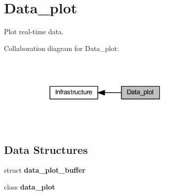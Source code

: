 \section{Data\+\_\+plot}
\label{group__data__plot}


Plot real-\/time data.  


Collaboration diagram for Data\+\_\+plot\+:
\nopagebreak
\begin{figure}[H]
\begin{center}
\leavevmode
\includegraphics[width=247pt]{group__data__plot}
\end{center}
\end{figure}
\subsection*{Data Structures}
\begin{DoxyCompactItemize}
\item 
struct \textbf{ data\+\_\+plot\+\_\+buffer}
\item 
class \textbf{ data\+\_\+plot}
\end{DoxyCompactItemize}
